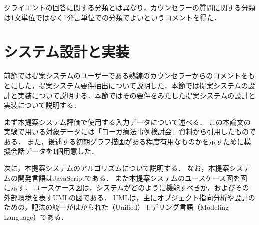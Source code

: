 \documentclass[shuuron]{kuee}
\begin{document}

クライエントの回答に関する分類とは異なり，カウンセラーの質問に関する分類は1文単位ではなく1発言単位での分類でよいというコメントを得た．


\section{システム設計と実装}





前節では提案システムのユーザーである熟練のカウンセラーからのコメントをもとにした，提案システム要件抽出について説明した．本節では提案システムの設計と実装について説明する．本節ではその要件をみたした提案システムの設計と実装について説明する．



まず本提案システム評価で使用する入力データについて述べる．
この本論文の実験で用いる対象データには「ヨーガ療法事例検討会」資料から引用したものである．
また，後述する初期グラフ描画がある程度有用なものかを示すために模擬会話データを1個用意した．

次に，本提案システムのアルゴリズムについて説明する．
なお，本提案システムの開発言語はJavaScriptである．
また本提案システムのユースケース図を図
に示す．
ユースケース図は，システムがどのように機能すべきか，およびその外部環境を表すUMLの図である．
UMLは，主にオブジェクト指向分析や設計のための，記法の統一がはかられた（Unified）モデリング言語（Modeling Language）である．
\end{document}
